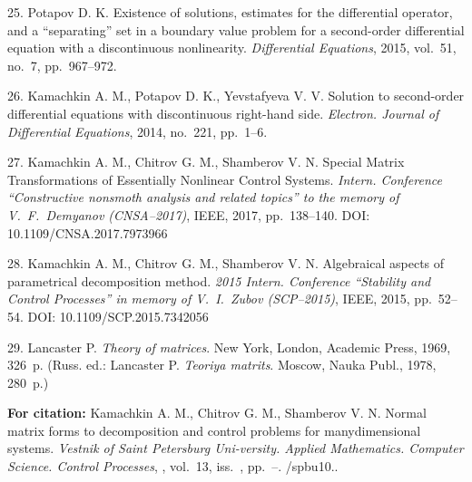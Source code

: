 {25. Potapov D. K. Existence of solutions, estimates for the
differential operator, and a ``separating'' set in a boundary
value problem for a second-order differential equation with a
discontinuous nonlinearity. {\it Differential Equations}, 2015,
vol.~51, no.~7, pp.~967--972.

26. Kamachkin A. M., Potapov D. K., Yevstafyeva V. V. Solution to
second-order differential equations with discontinuous right-hand
side. {\it Electron. Journal of Differential Equations}, 2014,
no.~221, pp.~1--6.

27. Kamachkin A. M., Chitrov G. M., Shamberov V. N. Special Matrix
Transformations of Essentially Nonlinear Control Systems. {\it
Intern. Conference ``Constructive nonsmoth analysis and related
topics'' to the memory of V.~F.~Demyanov (CNSA--2017)}, IEEE,
2017, pp.~138--140. DOI: 10.1109/CNSA.2017.7973966


28. Kamachkin A. M., Chitrov G. M., Shamberov V. N. Algebraical
aspects of parametrical decomposition method. {\it 2015 Intern.
Conference ``Stability and Control Processes'' in memory of
V.~I.~Zubov (SCP--2015)}, IEEE, 2015, pp.~52--54. DOI:
10.1109/SCP.2015.7342056

29. Lancaster P. {\it Theory of matrices}. New York, London,
Academic Press, 1969, 326~p. (Russ. ed.: Lancaster P. {\it Teoriya
matrits}. Moscow, Nauka Publ., 1978, 280~p.)



\vskip 2mm

{\bf For citation:}  Kamachkin A. M., Chitrov G. M., Shamberov V.
N. Normal matrix forms to decomposition and control problems for
manydimensional systems. {\it Vestnik of Saint Petersburg
Uni-\linebreak versity. Applied Mathematics. Computer Science.
Control Processes}, \issueyear, vol.~13, iss.~\issuenum,
pp.~\pageref{p8}--\pageref{p8e}.
\doivyp/spbu10.\issueyear.


}
